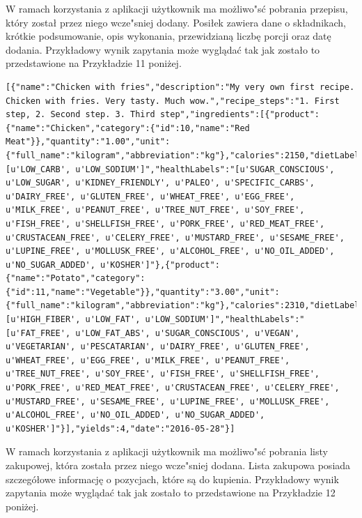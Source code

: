 \documentclass{article}
\begin{document}
W ramach korzystania z aplikacji użytkownik ma możliwo"sć pobrania przepisu, który został przez niego wcze"sniej dodany. Posiłek zawiera dane o składnikach, krótkie podsumowanie, opis wykonania, przewidzianą liczbę porcji oraz datę dodania. Przykładowy wynik zapytania może wyglądać tak jak zostało to przedstawione na Przykładzie 11 poniżej.

\begin{lstlisting}[label=recipe_api,caption=Pobranie przepisu,breaklines=true]
[{"name":"Chicken with fries","description":"My very own first recipe. Chicken with fries. Very tasty. Much wow.","recipe_steps":"1. First step, 2. Second step. 3. Third step","ingredients":[{"product":{"name":"Chicken","category":{"id":10,"name":"Red Meat"}},"quantity":"1.00","unit":{"full_name":"kilogram","abbreviation":"kg"},"calories":2150,"dietLabels":"[u'LOW_CARB', u'LOW_SODIUM']","healthLabels":"[u'SUGAR_CONSCIOUS', u'LOW_SUGAR', u'KIDNEY_FRIENDLY', u'PALEO', u'SPECIFIC_CARBS', u'DAIRY_FREE', u'GLUTEN_FREE', u'WHEAT_FREE', u'EGG_FREE', u'MILK_FREE', u'PEANUT_FREE', u'TREE_NUT_FREE', u'SOY_FREE', u'FISH_FREE', u'SHELLFISH_FREE', u'PORK_FREE', u'RED_MEAT_FREE', u'CRUSTACEAN_FREE', u'CELERY_FREE', u'MUSTARD_FREE', u'SESAME_FREE', u'LUPINE_FREE', u'MOLLUSK_FREE', u'ALCOHOL_FREE', u'NO_OIL_ADDED', u'NO_SUGAR_ADDED', u'KOSHER']"},{"product":{"name":"Potato","category":{"id":11,"name":"Vegetable"}},"quantity":"3.00","unit":{"full_name":"kilogram","abbreviation":"kg"},"calories":2310,"dietLabels":"[u'HIGH_FIBER', u'LOW_FAT', u'LOW_SODIUM']","healthLabels":"[u'FAT_FREE', u'LOW_FAT_ABS', u'SUGAR_CONSCIOUS', u'VEGAN', u'VEGETARIAN', u'PESCATARIAN', u'DAIRY_FREE', u'GLUTEN_FREE', u'WHEAT_FREE', u'EGG_FREE', u'MILK_FREE', u'PEANUT_FREE', u'TREE_NUT_FREE', u'SOY_FREE', u'FISH_FREE', u'SHELLFISH_FREE', u'PORK_FREE', u'RED_MEAT_FREE', u'CRUSTACEAN_FREE', u'CELERY_FREE', u'MUSTARD_FREE', u'SESAME_FREE', u'LUPINE_FREE', u'MOLLUSK_FREE', u'ALCOHOL_FREE', u'NO_OIL_ADDED', u'NO_SUGAR_ADDED', u'KOSHER']"}],"yields":4,"date":"2016-05-28"}]
\end{lstlisting}

W ramach korzystania z aplikacji użytkownik ma możliwo"sć pobrania listy zakupowej, która została przez niego wcze"sniej dodana. Lista zakupowa posiada szczegółowe informację o pozycjach, które są do kupienia. Przykładowy wynik zapytania może wyglądać tak jak zostało to przedstawione na Przykładzie 12 poniżej.
\end{document}
